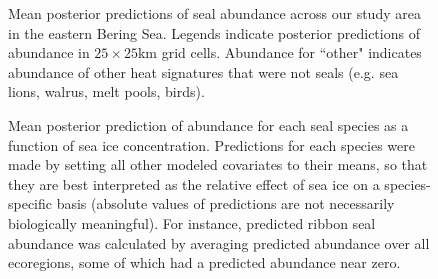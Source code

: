 \documentclass[12pt,fleqn]{article}
\begin{document}
\begin{flushleft}
\begin{figure}
\begin{center}
\end{center}
\caption{Mean posterior predictions of seal abundance across our study area in the eastern Bering Sea.  Legends indicate posterior predictions of abundance in $25 \times 25$km grid cells.  Abundance for ``other" indicates abundance of other heat signatures that were not seals (e.g. sea lions, walrus, melt pools, birds).}
\label{fig:dists}
\end{figure}

\begin{figure}
\begin{center}
\end{center}
\caption{Mean posterior prediction of abundance for each seal species as a function of sea ice concentration.  Predictions for each species were made by setting all other modeled covariates to their means, so that they are best interpreted as the relative effect of sea ice on a species-specific basis (absolute values of predictions are not necessarily biologically meaningful).  For instance, predicted ribbon seal abundance was calculated by averaging predicted abundance over all ecoregions, some of which had a predicted abundance near zero.}
\label{fig:ice_eff}
\end{figure}

\end{flushleft}
\end{document}
